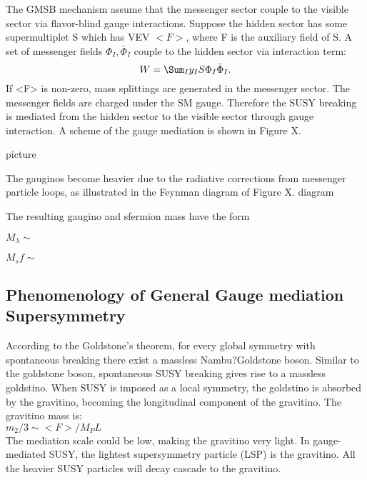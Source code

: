 \documentclass[thesis.tex]{subfiles}
\begin{document}
The GMSB mechanism assume that the messenger sector couple to the visible sector via flavor-blind gauge interactions. 
Suppose the hidden sector has some supermultiplet S which has VEV $<F>$, where F is the auxiliary field of S. 
A set of messenger fields ${\Phi_I, \bar{\Phi}_I}$ couple to the hidden sector via interaction term:
	 \begin{equation}
	W = \Sum_I y_I S \Phi_I \bar{\Phi}_I.
	\end{equation}
If <F> is non-zero, mass splittings are generated in the messenger sector. 
The messenger fields are charged under the SM gauge. 
Therefore the SUSY breaking is mediated from the hidden sector to the visible sector through gauge interaction. A scheme of the gauge mediation is shown in Figure X. 

picture

The gauginos become heavier due to the radiative corrections from messenger particle loops, as illustrated in the Feynman diagram of Figure X. 
 	diagram

The resulting gaugino and sfermion mass have the form

	$M_\lambda \sim $ 
	
	$M_sf \sim$

\subsection{Phenomenology of General Gauge mediation Supersymmetry}

According to the Goldstone's theorem, for every global symmetry with spontaneous breaking there exist a massless Nambu?Goldstone boson. 
Similar to the goldstone boson, spontaneous SUSY breaking gives rise to a massless goldstino. 
When SUSY is imposed as a local symmetry, the goldstino is absorbed by the gravitino, becoming the longitudinal component of the gravitino. 
The gravitino mass is:\\
	$m_2/3 \sim <F>/M_PL$
	\\
The mediation scale could be low, making the gravitino very light. 
In gauge-mediated SUSY, the lightest supersymmetry particle (LSP) is the gravitino. 
All the heavier SUSY particles will decay cascade to the gravitino. 
\end{document}
